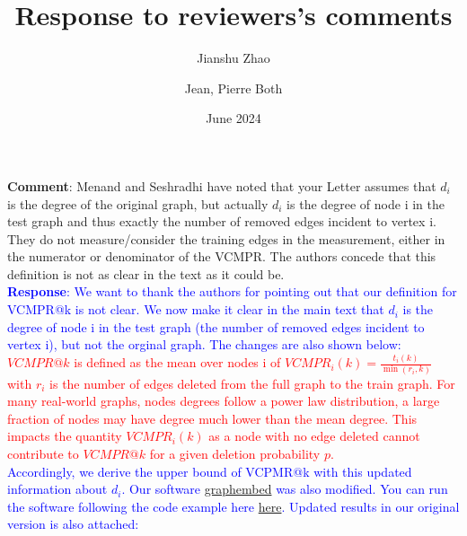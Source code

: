 \documentclass{article}
\title{Response to reviewers's comments}
\author[1]{Jianshu Zhao}
\author[2,*]{Jean, Pierre Both}
\affil[1]{Center for Bioinformatics and Computational Genomics, Georgia Institute of Technology, Atlanta, Georgia, USA}
\affil[2]{Université Paris-Saclay, CEA, List, Palaiseau, France. (Retired)}
\affil[*]{Corresponding author : jeanpierre.both@gmail.com}
\date{June 2024}
\begin{document}
\maketitle

\textbf{Comment}: Menand and Seshradhi have noted that your Letter assumes that $d_i$ 
is the degree of the original graph, but actually $d_i$ is the degree 
of node i in the test graph and thus exactly the number of removed 
edges incident to vertex i. They do not measure/consider the training 
edges in the measurement, either in the numerator or denominator of the VCMPR. 
The authors concede that this definition is not as clear in the text as it could be.\\

\textcolor{blue}{\textbf{Response}: We want to thank the authors for pointing out that our definition for VCMPR@k is not clear.
We now make it clear in the main text that $d_i$ is the degree 
of node i in the test graph (the number of removed 
edges incident to vertex i), but not the orginal graph. The changes are also shown below:}\\

\textcolor{red}{$VCMPR@k$ is defined as the mean over nodes i of  $ VCMPR_{i}(k)= \frac{t_{i}(k)}{\min(r_{i},k)}$ with $ r_{i} $ is the number of edges deleted from the full graph to the train graph.
For many real-world graphs, nodes degrees follow a power law distribution, a large fraction of nodes may have degree much lower than the mean degree.
This impacts the quantity $ VCMPR_{i}(k)$ as a node with no edge deleted cannot contribute to $VCMPR@k$ for a given deletion probability $p$.}\\


\textcolor{blue}{Accordingly, we derive the upper bound of VCPMR@k with this updated information about $d_i$.  Our software \href{https://github.com/jean-pierreBoth/graphembed}{\color{blue}graphembed} was also modified. 
You can run the software following the code example here \href{https://github.com/jean-pierreBoth/linkauc/blob/master/running_graphembed.md}{\color{blue}here}.
Updated results in our original version is also attached:}\\
\end{document}
